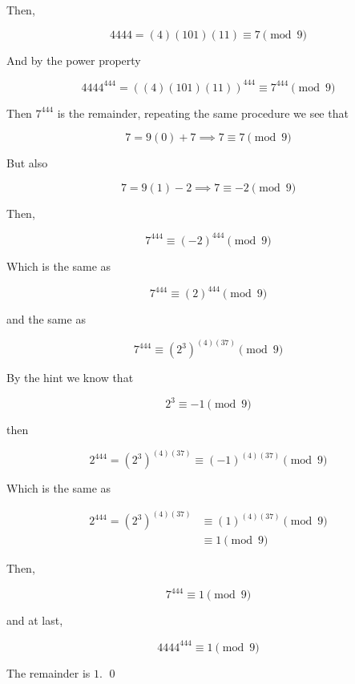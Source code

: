 \documentclass{article}
\begin{document}
Then,

$$4444 = (4)(101)(11) \equiv 7 \pmod{9}$$

And by the power property

$$4444^{444} = ((4)(101)(11))^{444} \equiv 7^{444} \pmod{9}$$

Then $7^{444}$ is the remainder, repeating the same procedure we see that

$$7 = 9(0) + 7 \implies 7 \equiv 7 \pmod{9}$$

But also

$$7 = 9(1) - 2 \implies 7 \equiv -2 \pmod{9}$$

Then,

$$7^{444} \equiv (-2)^{444} \pmod{9}$$

Which is the same as

$$7^{444} \equiv (2)^{444} \pmod{9}$$

and the same as

$$7^{444} \equiv (2^3)^{(4)(37)} \pmod{9}$$

By the hint we know that

$$2^{3} \equiv -1 \pmod{9}$$

then

$$2^{444} = (2^{3})^{(4)(37)} \equiv (-1)^{(4)(37)} \pmod{9}$$

Which is the same as

\begin{align*}
  2^{444} = (2^{3})^{(4)(37)} &\equiv (1)^{(4)(37)} \pmod{9}\\
  &\equiv 1 \pmod{9}
\end{align*}

Then,

$$7^{444} \equiv 1 \pmod{9}$$

and at last,

$$4444^{444} \equiv 1 \pmod{9}$$

The remainder is $1$. \qed
\end{document}
